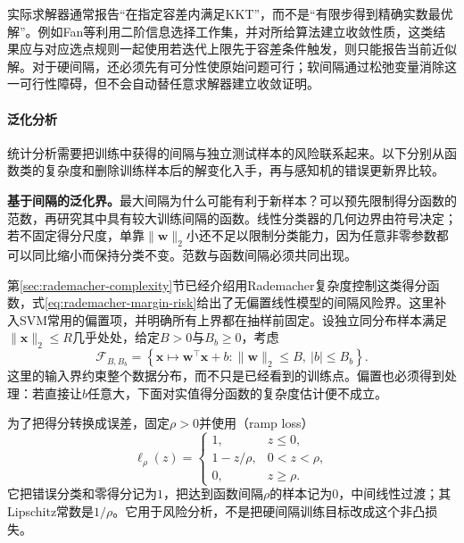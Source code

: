 实际求解器通常报告“在指定容差内满足KKT”，而不是“有限步得到精确实数最优解”。例如Fan等利用二阶信息选择工作集，并对所给算法建立收敛性质，这类结果应与对应选点规则一起使用若迭代上限先于容差条件触发，则只能报告当前近似解。对于硬间隔，还必须先有可分性使原始问题可行；软间隔通过松弛变量消除这一可行性障碍，但不会自动替任意求解器建立收敛证明。

\paragraph{泛化分析}
\label{sec:classification-svm-generalization}

统计分析需要把训练中获得的间隔与独立测试样本的风险联系起来。以下分别从函数类的复杂度和删除训练样本后的解变化入手，再与感知机的错误更新界比较。

\label{sec:classification-svm-margin-generalization}

\textbf{基于间隔的泛化界。}最大间隔为什么可能有利于新样本？可以预先限制得分函数的范数，再研究其中具有较大训练间隔的函数。线性分类器的几何边界由符号决定；若不固定得分尺度，单靠$\lVert\bm{w}\rVert_2$小还不足以限制分类能力，因为任意非零参数都可以同比缩小而保持分类不变。范数与函数间隔必须共同出现。

第\ref{sec:rademacher-complexity}节已经介绍用Rademacher复杂度控制这类得分函数，式\eqref{eq:rademacher-margin-risk}给出了无偏置线性模型的间隔风险界。这里补入SVM常用的偏置项，并明确所有上界都在抽样前固定。设独立同分布样本满足$\lVert\bm{x}\rVert_2\le R$几乎处处，给定$B>0$与$B_b\ge0$，考虑
\[
  \mathcal{F}_{B,B_b}
  =\left\{
    \bm{x}\mapsto\bm{w}^{\top}\bm{x}+b:
    \lVert\bm{w}\rVert_2\le B,\ |b|\le B_b
   \right\}.
\]
这里的输入界约束整个数据分布，而不只是已经看到的训练点。偏置也必须得到处理：若直接让$b$任意大，下面对实值得分函数的复杂度估计便不成立。

为了把得分转换成误差，固定$\rho>0$并使用（ramp loss）
\begin{equation}
  \ell_\rho(z)=
  \begin{cases}
    1, & z\le0,\\
    1-z/\rho, & 0<z<\rho,\\
    0, & z\ge\rho.
  \end{cases}
  \label{eq:classification-svm-ramp}
\end{equation}
它把错误分类和零得分记为$1$，把达到函数间隔$\rho$的样本记为$0$，中间线性过渡；其Lipschitz常数是$1/\rho$。它用于风险分析，不是把硬间隔训练目标改成这个非凸损失。

